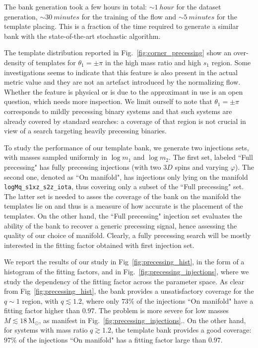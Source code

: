 \documentclass[twocolumn,showpacs,preprintnumbers,nofootinbib,prd,
superscriptaddress,10pt]{revtex4-2}
\begin{document}
The bank generation took a few hours in total: ${\sim \SI{1}{hour}}$ for the dataset generation, ${\sim \SI{30}{minutes}}$ for the training of the flow and ${\sim \SI{5}{minutes}}$ for the template placing. This is a fraction of the time required to generate a similar bank with the state-of-the-art stochastic algorithm.

The template distribution reported in Fig.~\ref{fig:corner_precessing} show an over-density of templates for $\theta_1 = \pm\pi$ in the high mass ratio and high $s_1$ region. Some investigations seems to indicate that this feature is also present in the actual metric value and they are not an artefact introduced by the normalizing flow. Whether the feature is physical or is due to the approximant in use is an open question, which needs more inspection.
We limit ourself to note that $\theta_1 = \pm\pi$ corresponds to mildly precessing binary systems and that such systems are already covered by standard searches: a coverage of that region is not crucial in view of a search targeting heavily precessing binaries.

To study the performance of our template bank, we generate two injections sets, with masses sampled uniformly in $\log m_1$ and $\log m_2$.
The first set, labeled ``Full precessing" has fully precessing injections (with two $3D$ spins and varying $\varphi$). The second one, denoted as ``On manifold", has injections only lying on the manifold \texttt{logMq\_s1xz\_s2z\_iota}, thus covering only a subset of the ``Full precessing" set.
The latter set is needed to asses the coverage of the bank on the manifold the templates lie on and thus is a measure of how accurate is the placement of the templates.
On the other hand, the ``Full precessing" injection set evaluates the ability of the bank to recover a generic precessing signal, hence assessing the quality of our choice of manifold.
Clearly, a fully precessing search will be mostly interested in the fitting factor obtained with first injection set.

We report the results of our study in Fig~\ref{fig:precessing_hist}, in the form of a histogram of the fitting factors, and in Fig.~\ref{fig:precessing_injections}, where we study the dependency of the fitting factor across the parameter space.
As clear from Fig~\ref{fig:precessing_hist}, the bank provides a unsatisfactory coverage for the $q\sim 1$ region, with $q \lesssim 1.2$, where only $73\%$ of the injections ``On manifold" have a fitting factor higher than $0.97$. The problem is more severe for low masses $M\lesssim \SI{18}{\mathrm{M_\odot}}$, as manifest in Fig.~\ref{fig:precessing_injections}..
On the other hand, for systems with mass ratio $q \gtrsim 1.2$, the template bank provides a good coverage: $97\%$ of the injections ``On manifold" has a fitting factor large than $0.97$.
\end{document}
